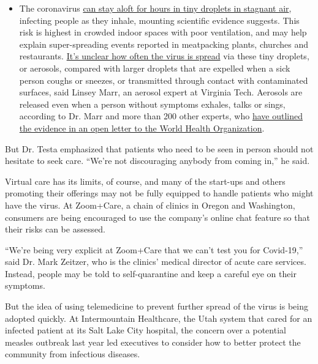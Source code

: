 \begin{itemize}
  \begin{itemize}
  \tightlist
  \item
    The coronavirus
    \href{https://www.nytimes.com/2020/07/04/health/239-experts-with-one-big-claim-the-coronavirus-is-airborne.html?action=click\&pgtype=Article\&state=default\&region=MAIN_CONTENT_3\&context=storylines_faq}{can
    stay aloft for hours in tiny droplets in stagnant air}, infecting
    people as they inhale, mounting scientific evidence suggests. This
    risk is highest in crowded indoor spaces with poor ventilation, and
    may help explain super-spreading events reported in meatpacking
    plants, churches and restaurants.
    \href{https://www.nytimes.com/2020/07/06/health/coronavirus-airborne-aerosols.html?action=click\&pgtype=Article\&state=default\&region=MAIN_CONTENT_3\&context=storylines_faq}{It's
    unclear how often the virus is spread} via these tiny droplets, or
    aerosols, compared with larger droplets that are expelled when a
    sick person coughs or sneezes, or transmitted through contact with
    contaminated surfaces, said Linsey Marr, an aerosol expert at
    Virginia Tech. Aerosols are released even when a person without
    symptoms exhales, talks or sings, according to Dr. Marr and more
    than 200 other experts, who
    \href{https://academic.oup.com/cid/article/doi/10.1093/cid/ciaa939/5867798}{have
    outlined the evidence in an open letter to the World Health
    Organization}.
  \end{itemize}
\end{itemize}

But Dr. Testa emphasized that patients who need to be seen in person
should not hesitate to seek care. ``We're not discouraging anybody from
coming in,'' he said.

Virtual care has its limits, of course, and many of the start-ups and
others promoting their offerings may not be fully equipped to handle
patients who might have the virus. At Zoom+Care, a chain of clinics in
Oregon and Washington, consumers are being encouraged to use the
company's online chat feature so that their risks can be assessed.

``We're being very explicit at Zoom+Care that we can't test you for
Covid-19,'' said Dr. Mark Zeitzer, who is the clinics' medical director
of acute care services. Instead, people may be told to self-quarantine
and keep a careful eye on their symptoms.

But the idea of using telemedicine to prevent further spread of the
virus is being adopted quickly. At Intermountain Healthcare, the Utah
system that cared for an infected patient at its Salt Lake City
hospital, the concern over a potential measles outbreak last year led
executives to consider how to better protect the community from
infectious diseases.

